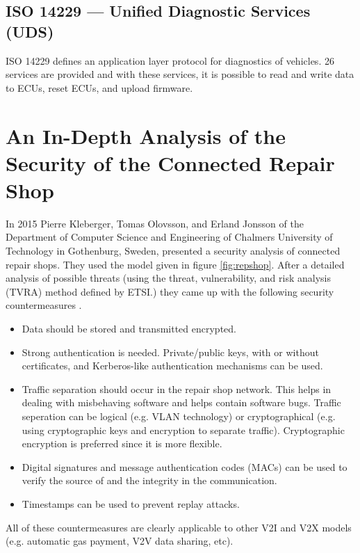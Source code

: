 \documentclass[11pt]{article}
\begin{document}
\subsection{ISO 14229 — Unified Diagnostic Services (UDS)}

ISO 14229 defines an application layer protocol for diagnostics of vehicles. 26 services are provided and with these services, it is possible to read and write data to ECUs, reset ECUs, and upload firmware. \cite{ISO14229}

\section{An In-Depth Analysis of the Security of the Connected Repair Shop}

In 2015 Pierre Kleberger, Tomas Olovsson, and Erland Jonsson of the Department of Computer Science and Engineering of Chalmers University of Technology
in Gothenburg, Sweden, presented a security analysis of connected repair shops. They used the model given in figure \ref{fig:repshop}. After a detailed analysis of possible threats (using the threat, vulnerability, and risk analysis (TVRA) method defined by ETSI.) they came up with the following security countermeasures \cite{Kleberger15}.

\begin{itemize}
	\item Data should be stored and transmitted encrypted.
	\item Strong authentication is needed. Private/public keys, with or without certificates, and Kerberos-like authentication mechanisms can be used.
	\item Traffic separation should occur in the repair shop network. This helps in dealing with misbehaving software and helps contain software bugs. Traffic seperation can be logical (e.g. VLAN technology) or cryptographical (e.g. using cryptographic keys and encryption to separate traffic). Cryptographic encryption is preferred since it is more flexible.
	\item Digital signatures and message authentication codes (MACs) can be used to verify the source of and the integrity in the communication.
	\item Timestamps  can be used to prevent replay attacks.
\end{itemize}

All of these countermeasures are clearly applicable to other V2I and V2X models (e.g. automatic gas payment, V2V data sharing, etc).
\end{document}
